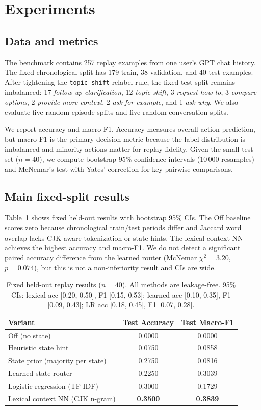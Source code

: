 \section{Experiments}

\subsection{Data and metrics}

The benchmark contains 257 replay examples from one user's GPT chat history. The fixed chronological split has 179 train, 38 validation, and 40 test examples. After tightening the \texttt{topic\_shift} relabel rule, the fixed test split remains imbalanced: 17 \emph{follow-up clarification}, 12 \emph{topic shift}, 3 \emph{request how-to}, 3 \emph{compare options}, 2 \emph{provide more context}, 2 \emph{ask for example}, and 1 \emph{ask why}. We also evaluate five random episode splits and five random conversation splits.

We report accuracy and macro-F1. Accuracy measures overall action prediction, but macro-F1 is the primary decision metric because the label distribution is imbalanced and minority actions matter for replay fidelity. Given the small test set ($n=40$), we compute bootstrap 95\% confidence intervals (10\,000 resamples) and McNemar's test with Yates' correction for key pairwise comparisons.

\subsection{Main fixed-split results}

Table~\ref{tab:fixed} shows fixed held-out results with bootstrap 95\% CIs. The Off baseline scores zero because chronological train/test periods differ and Jaccard word overlap lacks CJK-aware tokenization or state hints. The lexical context NN achieves the highest accuracy and macro-F1. We do not detect a significant paired accuracy difference from the learned router (McNemar $\chi^2=3.20$, $p=0.074$), but this is not a non-inferiority result and CIs are wide.

\begin{table}[tbp]
\centering
\small
\begin{tabular}{lcc}
\toprule
Variant & Test Accuracy & Test Macro-F1 \\
\midrule
Off (no state) & 0.0000 & 0.0000 \\
Heuristic state hint & 0.0750 & 0.0858 \\
State prior (majority per state) & 0.2750 & 0.0816 \\
Learned state router & 0.2250 & 0.3039 \\
Logistic regression (TF-IDF) & 0.3000 & 0.1729 \\
Lexical context NN (CJK n-gram) & \textbf{0.3500} & \textbf{0.3839} \\
\bottomrule
\end{tabular}
\caption{Fixed held-out replay results ($n=40$). All methods are leakage-free. 95\% CIs: lexical acc [0.20, 0.50], F1 [0.15, 0.53]; learned acc [0.10, 0.35], F1 [0.09, 0.43]; LR acc [0.18, 0.45], F1 [0.07, 0.28].}
\label{tab:fixed}
\end{table}


